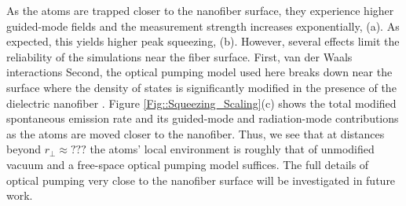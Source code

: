 \documentclass[preprint,aps,pra,onecolumn]{revtex4-1} %
\begin{document}
As the atoms are trapped closer to the nanofiber surface, they experience higher guided-mode fields and the measurement strength increases exponentially, (a). As expected, this yields higher peak squeezing, (b). However, several effects limit the reliability of the simulations near the fiber surface. First, van der Waals interactions  Second, the optical pumping model used here breaks down near the surface where the density of states is significantly modified in the presence of the dielectric nanofiber \cite{}. Figure \ref{Fig::Squeezing_Scaling}(c) shows the total modified spontaneous emission rate and its guided-mode and radiation-mode contributions as the atoms are moved closer to the nanofiber. Thus, we see that at distances beyond $r_\perp \approx ???$ the atoms' local environment is roughly that of unmodified vacuum and a free-space optical pumping model suffices. The full details of optical pumping very close to the nanofiber surface will be investigated in future work.
\end{document}
